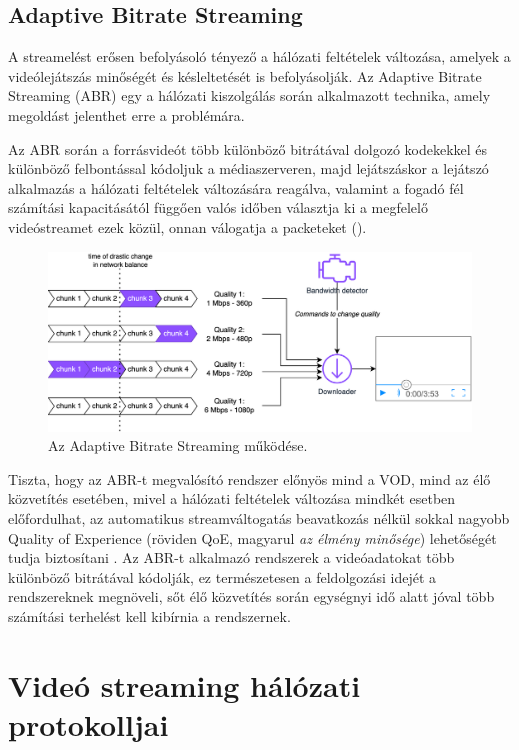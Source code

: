 \subsection{Adaptive Bitrate Streaming}

A streamelést erősen befolyásoló tényező a hálózati feltételek változása, amelyek a videólejátszás minőségét és késleltetését is befolyásolják. Az Adaptive Bitrate Streaming (ABR) egy a hálózati kiszolgálás során alkalmazott technika, amely megoldást jelenthet erre a problémára.

Az ABR során a forrásvideót több különböző bitrátával dolgozó kodekekkel és különböző felbontással kódoljuk a médiaszerveren, majd lejátszáskor a lejátszó alkalmazás a hálózati feltételek változására reagálva, valamint a fogadó fél számítási kapacitásától függően valós időben választja ki a megfelelő vi\-de\-ó\-strea\-met ezek közül, onnan válogatja a packeteket ().

\begin{figure}
	\centering
	\includegraphics[width=140mm, keepaspectratio]{figures/dipterv_abr.png}
	\caption{Az Adaptive Bitrate Streaming működése.}
	\label{fig:ABR}
\end{figure}

Tiszta, hogy az ABR-t megvalósító rendszer előnyös mind a VOD, mind az élő közvetítés esetében, mivel a hálózati feltételek változása mindkét esetben előfordulhat, az automatikus streamváltogatás beavatkozás nélkül sokkal nagyobb Quality of Experience (röviden QoE, magyarul \emph{az élmény minősége}) lehetőségét tudja biztosítani \cite{DashAbr}. Az ABR-t alkalmazó rendszerek a videóadatokat több különböző bitrátával kódolják, ez természetesen a feldolgozási idejét a rendszereknek megnöveli, sőt élő közvetítés során egységnyi idő alatt jóval több számítási terhelést kell kibírnia a rendszernek.

\section{Videó streaming hálózati protokolljai}

